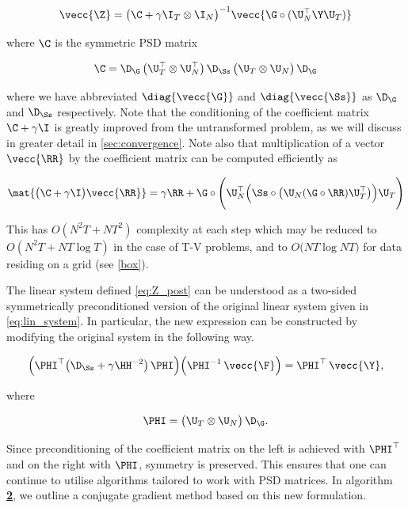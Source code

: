 \begin{equation}
    \label{eq:Z_post}
    \vecc{\Z} = \big( \C + \gamma \I_T \otimes \I_N \big) ^{-1} \vecc{\G \circ (\U_N^\top \Y \U_T)}
\end{equation}

\noindent where $\C$ is the symmetric PSD matrix


\begin{equation}
    \label{eq:Q}
    \C = \D_{\G} \, \big(\U_T^\top \otimes \U_N^\top \big)\, \D_{\Ss} \, \big(\U_T \otimes \U_N \big) \,\D_{\G}
\end{equation}

\noindent where we have abbreviated $\diag{\vecc{\G}}$ and $\diag{\vecc{\Ss}}$ as $\D_{\G}$ and $\D_{\Ss}$ respectively. Note that the conditioning of the coefficient matrix $\C + \gamma \I$ is greatly improved from the untransformed problem, as we will discuss in greater detail in \cref{sec:convergence}. Note also that multiplication of a vector $\vecc{\RR}$ by the coefficient matrix can be computed efficiently as 

$$
\mat{\big(\C + \gamma \I \big)\vecc{\RR}} = \gamma \RR + \G \circ \Bigg(\U_N^\top \Big( \Ss \circ \big(\U_N (\G \circ \RR) \U_T^\top \big) \Big) \U_T\Bigg) 
$$

This has $O(N^2T + NT^2)$ complexity at each step which may be  reduced to $O(N^2T + NT \log T)$ in the case of T-V problems, and to $O\big(NT \log NT \big)$ for data residing on a grid (see \cref{box}). 

The linear system defined \cref{eq:Z_post} can be understood as a two-sided symmetrically preconditioned version of the original linear system given in \cref{eq:lin_system}. In particular, the new expression can be constructed by modifying the original system in the following way.

\begin{equation}
    \Big(\PHI^\top  \big(\D_{\Ss} + \gamma  \HH^{-2}\big) \, \PHI  \Big) \Big(\PHI^{-1}\, \vecc{ \F } \Big) = \PHI^\top \, \vecc{\Y},
\end{equation}

\noindent where

\begin{equation}
    \PHI =   \big(\U_T \otimes \U_N\big) \, \D_{\G}.
\end{equation}

Since preconditioning of the coefficient matrix on the left is achieved with $\PHI^\top$ and on the right with $\PHI$, symmetry is preserved. This ensures that one can continue to utilise algorithms tailored to work with PSD matrices. In algorithm \hyperlink{al:CGM}{\textbf{2}}, we outline a conjugate gradient method based on this new formulation. 

